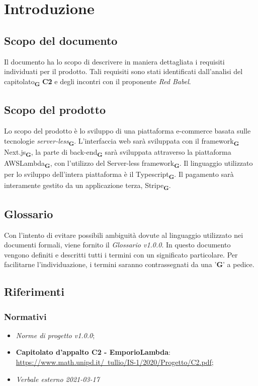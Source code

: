 \section{Introduzione}
    \subsection{Scopo del documento}
    Il documento ha lo scopo di descrivere in maniera dettagliata i requisiti individuati per il prodotto. Tali requisiti sono stati identificati dall'analisi del capitolato\textsubscript{\textbf{G}} \textbf{C2} e degli incontri con il proponente \textit{Red Babel}.
    \subsection{Scopo del prodotto}
    Lo scopo del prodotto è lo sviluppo di una piattaforma e-commerce basata sulle tecnologie \textit{server-less}\textsubscript{\textbf{G}}. L'interfaccia web sarà sviluppata con il framework\textsubscript{\textbf{G}} Next.js\textsubscript{\textbf{G}}, la parte di back-end\textsubscript{\textbf{G}} sarà sviluppata attraverso la piattaforma AWSLambda\textsubscript{\textbf{G}}, con l'utilizzo del Server-less framework\textsubscript{\textbf{G}}. Il linguaggio utilizzato per lo sviluppo dell'intera piattaforma è il Typescript\textsubscript{\textbf{G}}. Il pagamento sarà interamente gestito da un applicazione terza, Stripe\textsubscript{\textbf{G}}.
    \subsection{Glossario}
    Con l'intento di evitare possibili ambiguità dovute al linguaggio utilizzato nei documenti formali, viene fornito il \textit{Glossario v1.0.0}. In questo documento vengono definiti e descritti tutti i termini con un significato particolare. Per facilitarne l'individuazione, i termini saranno contrassegnati da una '\textbf{G}' a pedice.
    \subsection{Riferimenti}
    \subsubsection{Normativi}
    \begin{itemize}
        \item \textit{Norme di progetto v1.0.0};
        \item \textbf{Capitolato d'appalto C2 - EmporioLambda}:\\ \href{https://www.math.unipd.it/~tullio/IS-1/2020/Progetto/C2.pdf}{https://www.math.unipd.it/~tullio/IS-1/2020/Progetto/C2.pdf};
        \item \textit{Verbale esterno 2021-03-17}
    \end{itemize}

